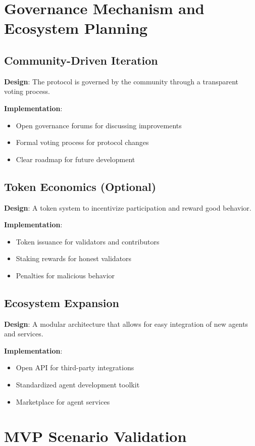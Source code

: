 \documentclass[11pt,twocolumn]{article}
\begin{document}
\section{Governance Mechanism and Ecosystem Planning}

\subsection{Community-Driven Iteration}
\textbf{Design}: The protocol is governed by the community through a transparent voting process.

\textbf{Implementation}:
\begin{itemize}
  \item Open governance forums for discussing improvements
  \item Formal voting process for protocol changes
  \item Clear roadmap for future development
\end{itemize}

\subsection{Token Economics (Optional)}
\textbf{Design}: A token system to incentivize participation and reward good behavior.

\textbf{Implementation}:
\begin{itemize}
  \item Token issuance for validators and contributors
  \item Staking rewards for honest validators
  \item Penalties for malicious behavior
\end{itemize}

\subsection{Ecosystem Expansion}
\textbf{Design}: A modular architecture that allows for easy integration of new agents and services.

\textbf{Implementation}:
\begin{itemize}
  \item Open API for third-party integrations
  \item Standardized agent development toolkit
  \item Marketplace for agent services
\end{itemize}

\section{MVP Scenario Validation}
\end{document}
